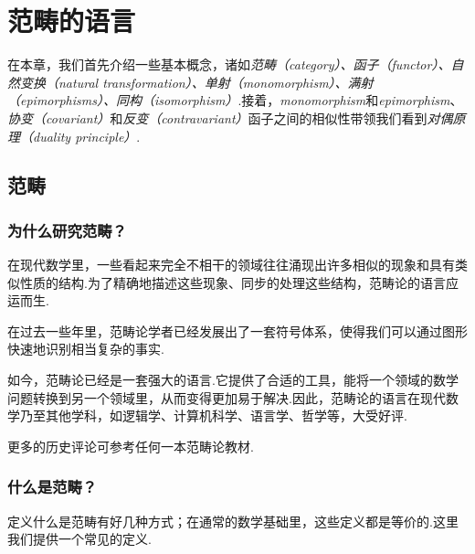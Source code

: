 \chapter{范畴的语言}
在本章，我们首先介绍一些基本概念，诸如\emph{范畴（category）、函子（functor）、自然变换（natural transformation）、单射（monomorphism）、满射（epimorphisms）、同构（isomorphism）}.接着，\emph{monomorphism}和\emph{epimorphism}、\emph{协变（covariant）}和\emph{反变（contravariant）}函子之间的相似性带领我们看到\emph{对偶原理（duality principle）}.
\minitoc
\newpage
\section{范畴}
\subsection{为什么研究范畴？}
  在现代数学里，一些看起来完全不相干的领域往往涌现出许多相似的现象和具有类似性质的结构.为了精确地描述这些现象、同步的处理这些结构，范畴论的语言应运而生.

  在过去一些年里，范畴论学者已经发展出了一套符号体系，使得我们可以通过图形快速地识别相当复杂的事实.

  如今，范畴论已经是一套强大的语言.它提供了合适的工具，能将一个领域的数学问题转换到另一个领域里，从而变得更加易于解决.因此，范畴论的语言在现代数学乃至其他学科，如逻辑学、计算机科学、语言学、哲学等，大受好评.

  更多的历史评论可参考任何一本范畴论教材.

\subsection{什么是范畴？}
  定义什么是范畴有好几种方式；在通常的数学基础里，这些定义都是等价的.这里我们提供一个常见的定义.

